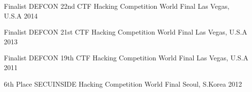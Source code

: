 

\begin{cvhonors}

  \cvhonor
  {Finalist} %
  {DEFCON 22nd CTF Hacking Competition World Final} %
  {Las Vegas, U.S.A} %
  {2014} %

  \cvhonor
  {Finalist} %
  {DEFCON 21st CTF Hacking Competition World Final} %
  {Las Vegas, U.S.A} %
  {2013} %

  \cvhonor
  {Finalist} %
  {DEFCON 19th CTF Hacking Competition World Final} %
  {Las Vegas, U.S.A} %
  {2011} %

  \cvhonor
  {6th Place} %
  {SECUINSIDE Hacking Competition World Final} %
  {Seoul, S.Korea} %
  {2012} %

\end{cvhonors}


